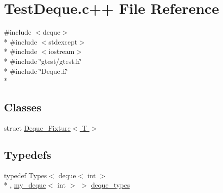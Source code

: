 \hypertarget{TestDeque_8c_09_09}{\section{Test\-Deque.\-c++ File Reference}
\label{TestDeque_8c_09_09}
}
{\ttfamily \#include $<$deque$>$}\\*
{\ttfamily \#include $<$stdexcept$>$}\\*
{\ttfamily \#include $<$iostream$>$}\\*
{\ttfamily \#include \char`\"{}gtest/gtest.\-h\char`\"{}}\\*
{\ttfamily \#include \char`\"{}Deque.\-h\char`\"{}}\\*
\subsection*{Classes}
\begin{DoxyCompactItemize}
\item 
struct \hyperlink{structDeque__Fixture}{Deque\-\_\-\-Fixture$<$ T $>$}
\end{DoxyCompactItemize}
\subsection*{Typedefs}
\begin{DoxyCompactItemize}
\item 
typedef Types$<$ deque$<$ int $>$\\*
, \hyperlink{classmy__deque}{my\-\_\-deque}$<$ int $>$ $>$ \hyperlink{TestDeque_8c_09_09_ad1999e4b3126317baa06a1266daa323c}{deque\-\_\-types}
\end{DoxyCompactItemize}
